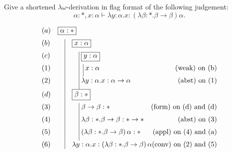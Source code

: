 \begin{problem}{4.5}
    Give a shortened $\lambda\omega$-derivation in flag format of the following judgement: 
    $$\alpha : *, x : \alpha \vdash \lambda y : \alpha . x : (\lambda \beta : * . \beta \rightarrow \beta)\alpha.$$
\end{problem}


\begin{solution}
    $$\begin{array}{ll}
        (a) & \fbox{$\alpha : *$} \\[6pt]

        (b) & \quad \vrule\quad \fbox{$x : \alpha$} \\[6pt]

        (c) & \quad \vrule\qquad\vrule\; \fbox{$y : \alpha$} \\[6pt]

        (1) & \quad \vrule\qquad\vrule\;\;\vrule\; x : \alpha 
            \hfill \text{(weak) on (b)} \\[6pt]

        (2) & \quad \vrule\qquad\vrule\; \lambda y : \alpha . x : \alpha \to \alpha 
            \hfill \text{(abst) on (1)} \\[6pt]

        (d) & \quad \vrule\quad \fbox{$\beta : *$} \\[6pt]

        (3) & \quad \vrule\qquad\vrule\; \beta \to \beta : * 
            \hfill \text{(form) on (d) and (d)} \\[6pt]

        (4) & \quad \vrule\qquad\vrule\; \lambda \beta : * . \beta \to \beta : * \to * 
            \hfill \text{(abst) on (3)} \\[6pt]

        (5) & \quad \vrule\qquad\vrule\; (\lambda \beta : * . \beta \to \beta)\, \alpha : * 
            \hfill \text{(appl) on (4) and (a)} \\[6pt]

        (6) & \quad \vrule\quad \lambda y : \alpha . x : (\lambda \beta : * . \beta \to \beta)\,\alpha 
            \hfill \text{(conv) on (2) and (5)}
    \end{array}$$
\end{solution}
